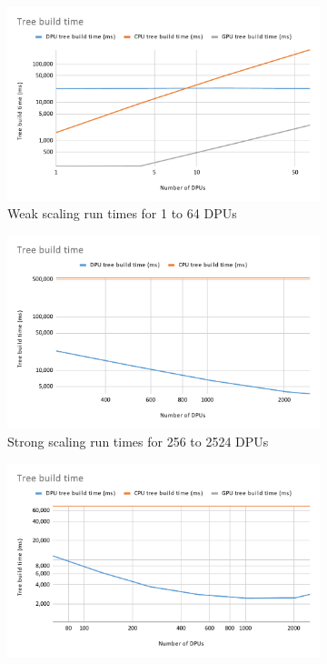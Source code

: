 \begin{figure}
    \begin{subfigure}{0.48\linewidth}
        \includegraphics[width=\linewidth]{figures/Treesweak.pdf}
        \caption{Weak scaling run times for 1 to 64 DPUs}
        \label{fig:Treessweak}
    \end{subfigure}\hfill
    \begin{subfigure}{0.48\linewidth}
        \includegraphics[width=\linewidth]{figures/Treesstrong.pdf}
        \caption{Strong scaling run times for 256 to 2524 DPUs}
        \label{fig:Treesstrong}
    \end{subfigure}\par\medskip
    \begin{subfigure}{0.48\linewidth}
        \includegraphics[width=\linewidth]{figures/TreesHiggs.pdf}

\end{subfigure}
\end{figure}
